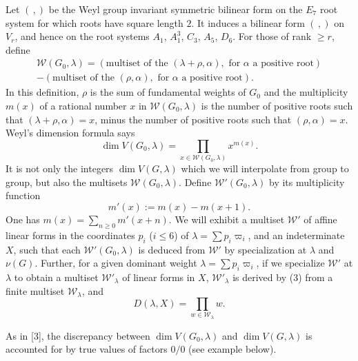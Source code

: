 \documentclass[11pt,a4paper]{article}
\begin{document}
Let $(\,,)$ be the Weyl group invariant symmetric bilinear form on the $E_{7}$ root system for which roots have square length $2$. It induces a bilinear form $(\,,)$ on $V_{r}$, and hence on the root systems $A_{1}$, $A_{1}^{3}$, $C_{3}$, $A_{5}$, $D_{6}$. For those of rank $\geqslant r$, define
\begin{multline*}
\mathcal{W}(G_{0}, \lambda) = (\text{multiset of the } (\lambda + \rho, \alpha), \text{ for } \alpha \text{ a positive root})\\
- (\text{multiset of the } (\rho, \alpha), \text{ for } \alpha \text{ a positive root}).
\end{multline*}
In this definition, $\rho$ is the sum of fundamental weights of $G_{0}$ and the multiplicity $m(x)$ of a rational number $x$ in $\mathcal{W}(G_{0}, \lambda)$ is the number of positive roots such that $(\lambda + \rho, \alpha) = x$, minus the number of positive roots such that $(\rho, \alpha) = x$. Weyl's dimension formula says
\begin{equation*}
\dim V(G_{0}, \lambda) = \prod_{x \in \mathcal{W}(G_{0}, \lambda)} x^{m(x)}.
\end{equation*}
It is not only the integers $\dim V(G, \lambda)$ which we will interpolate from group to group, but also the multisets $\mathcal{W}(G_{0}, \lambda)$. Define $\mathcal{W}'(G_{0}, \lambda)$ by its multiplicity function
\begin{equation}
m'(x) := m(x) - m(x+1).
\end{equation}
One has $m(x) = \sum_{n \geqslant 0} m'(x+n)$. We will exhibit a multiset $\mathcal{W}'$ of affine linear forms in the coordinates $p_{i}$ ($i \leqslant 6$) of $\lambda = \sum p_{i}\varpi_{i}$, and an indeterminate $X$, such that each $\mathcal{W}'(G_{0}, \lambda)$ is deduced from $\mathcal{W}'$ by specialization at $\lambda$ and $\nu(G)$. Further, for a given dominant weight $\lambda = \sum p_{i}\varpi_{i}$, if we specialize $\mathcal{W}'$ at $\lambda$ to obtain a multiset $\mathcal{W}'_{\lambda}$ of linear forms in $X$, $\mathcal{W}'_{\lambda}$ is derived by (3) from a finite multiset $\mathcal{W}_{\lambda}$, and
\begin{equation*}
D(\lambda, X) = \prod_{w \in \mathcal{W}_{\lambda}} w.
\end{equation*}

As in [3], the discrepancy between $\dim V(G_{0}, \lambda)$ and $\dim V(G, \lambda)$ is accounted for by true values of factors $0/0$ (see example below).
\end{document}
